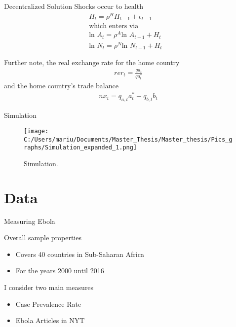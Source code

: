 \documentclass[11pt]{beamer}
\begin{document}
\begin{frame}{Decentralized Solution}
Shocks occur to health
\begin{align}
H_{t} = \rho^H H_{t-1} + \epsilon_{t-1} \\ \text{which enters via}& \nonumber \\
\text{ln } A_{t} = \rho^A \text{ln } A_{t-1} + H_{t} \\
\text{ln } N_{t} = \rho^N \text{ln } N_{t-1} + H_{t}
\end{align}

Further note, the real exchange rate for the home country
\begin{align}
rer_t = \frac{qa_t}{qa_t^*}
\end{align}
and the home country's trade balance
\begin{align}
nx_t = q_{a,t} a_t^* - q_{b,t} b_t 
\end{align}


\end{frame}

\begin{frame}{Simulation}
\begin{figure}[!ht]
\begin{center} 
\begin{minipage}[t]{\textwidth}
\texttt{[image: C:/Users/mariu/Documents/Master\_Thesis/Master\_thesis/Pics\_graphs/Simulation\_expanded\_1.png]}\\
\caption{Simulation.\label{Simulation Evidence}}
\end{minipage}
\end{center}
\end{figure}
\end{frame}


\section{Data}

\begin{frame}{Measuring Ebola}

Overall sample properties 
\begin{itemize}
\item Covers 40 countries in Sub-Saharan Africa
\item For the years 2000 until 2016
\end{itemize}

I consider two main measures
\begin{itemize}
\item Case Prevalence Rate
\item Ebola Articles in NYT
\end{itemize}

\end{frame}
\end{document}
